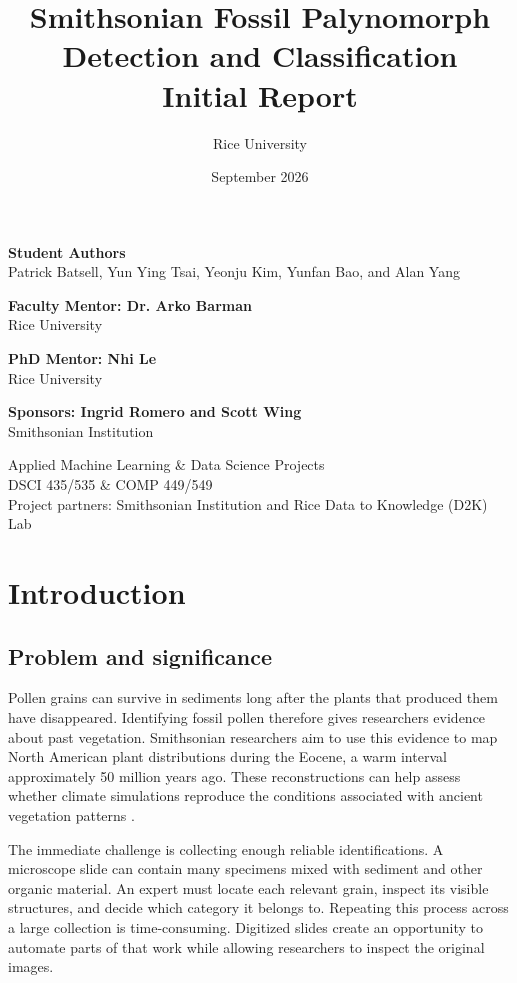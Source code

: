 \documentclass[11pt,letterpaper]{article}
\title{Smithsonian Fossil Palynomorph\\Detection and Classification\\[8pt]\large Initial Report}
\author{Rice University}
\date{September 2026}
\begin{document}
\maketitle
\vspace{1.5em}
\textbf{Student Authors}\\
Patrick Batsell, Yun Ying Tsai, Yeonju Kim, Yunfan Bao, and Alan Yang

\vspace{1.5em}
\textbf{Faculty Mentor: Dr. Arko Barman}\\
Rice University

\vspace{0.5em}
\textbf{PhD Mentor: Nhi Le}\\
Rice University

\vspace{0.5em}
\textbf{Sponsors: Ingrid Romero and Scott Wing}\\
Smithsonian Institution
\vfill
\begin{center}
Applied Machine Learning \& Data Science Projects\\
DSCI 435/535 \& COMP 449/549\\[6pt]
Project partners: Smithsonian Institution and Rice Data to Knowledge (D2K) Lab
\end{center}
\newpage
\tableofcontents
\newpage

\section{Introduction}
\subsection{Problem and significance}
Pollen grains can survive in sediments long after the plants that produced them have disappeared. Identifying fossil pollen therefore gives researchers evidence about past vegetation. Smithsonian researchers aim to use this evidence to map North American plant distributions during the Eocene, a warm interval approximately 50 million years ago. These reconstructions can help assess whether climate simulations reproduce the conditions associated with ancient vegetation patterns \citep{proposal2026}.

The immediate challenge is collecting enough reliable identifications. A microscope slide can contain many specimens mixed with sediment and other organic material. An expert must locate each relevant grain, inspect its visible structures, and decide which category it belongs to. Repeating this process across a large collection is time-consuming. Digitized slides create an opportunity to automate parts of that work while allowing researchers to inspect the original images.
\end{document}
